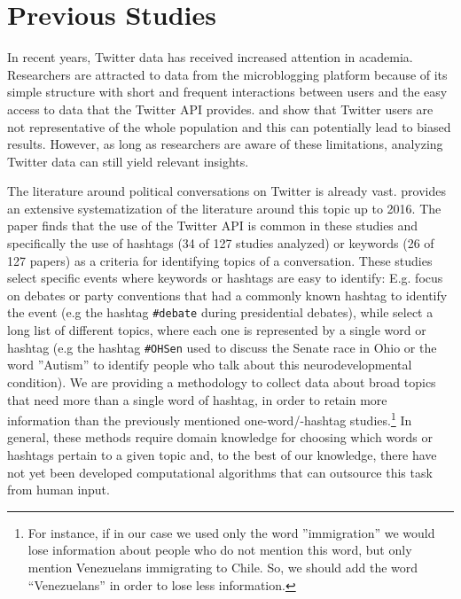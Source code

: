 \section{Previous Studies}\label{sec_lit}
    
    In recent years, Twitter data has received increased attention in academia. Researchers are attracted to data from the microblogging platform because of its simple structure with short and frequent interactions between users and the easy access to data that the Twitter API provides. \cite{tufekci2014big} and \cite{barbera2015understanding} show that Twitter users are not representative of the whole population and this can potentially lead to biased results. However, as long as researchers are aware of these limitations, analyzing Twitter data can still yield relevant insights. %
    
        \newline\indent
    The literature around political conversations on Twitter is already vast.
    \cite{jungherr2016twitter} provides an extensive systematization of the literature around this topic up to 2016. The paper finds that the use of the Twitter API is common in these studies and specifically the use of hashtags (34 of 127 studies analyzed) or keywords (26 of 127 papers) as a criteria for identifying topics of a conversation. These studies select specific events where keywords or hashtags are easy to identify: E.g. \cite{lin2014rising} focus on debates or party conventions that had a commonly known hashtag to identify the event (e.g the hashtag \texttt{\#debate} during presidential debates), while  \cite{himelboim_classifying_2017} select a long list of different topics, where each one is represented by a single word or hashtag (e.g the hashtag \texttt{\#OHSen} used to discuss the Senate race in Ohio or the word ''Autism'' to identify people who talk about this neurodevelopmental condition). We are providing a methodology to collect data about broad topics that need more than a single word of hashtag, in order to retain more information than the previously mentioned one-word/-hashtag studies.\footnote{For instance, if in our case we used only the word ''immigration'' we would lose information about people who do not mention this word, but only mention Venezuelans immigrating to Chile. So, we should add the word “Venezuelans” in order to lose less information.} In general, these methods require domain knowledge for choosing which words or hashtags pertain to a given topic and, to the best of our knowledge, there have not yet been developed computational algorithms that can outsource this task from human input.%
    
